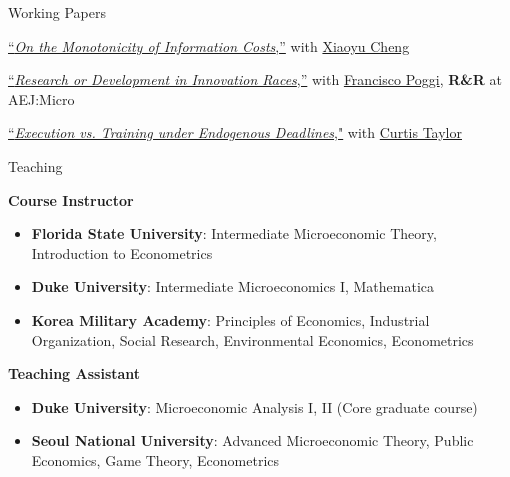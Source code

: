 \begin{rSection}{Working Papers}
	
	\begin{etaremune}
		
		\item \href{https://yonggyun-yg-kim.github.io/files/Research%20papers/BLmonotonicity.pdf}{``\textit{On the Monotonicity of Information Costs},''} with \href{https://xiaoyu-cheng.com/}{Xiaoyu Cheng}
		
		
		\item \href{https://yonggyun-yg-kim.github.io/files/Research%20papers/RDIR.pdf}{``\textit{Research or Development in Innovation Races},''}   with \href{https://www.franciscopoggi.com/}{Francisco Poggi}, \textbf{R\&R} at AEJ:Micro
		
		\item \href{https://yonggyun-yg-kim.github.io/files/Research%20papers/Execution-v-Training.pdf}{``\textit{Execution vs. Training under Endogenous Deadlines},"} with \href{https://sites.google.com/view/curtistaylor/home}{Curtis Taylor}
		
	\end{etaremune}
	
	
\end{rSection}
\medskip

\begin{rSection}{Teaching}
	
	
	\textbf{Course Instructor}	
	\begin{itemize}
		\item[] \textbf{Florida State University}: Intermediate Microeconomic Theory, Introduction to Econometrics
		\item[] \textbf{Duke University}: Intermediate Microeconomics I, Mathematica 
		\item[] \textbf{Korea Military Academy}: Principles of Economics, Industrial Organization, Social Research, Environmental Economics, Econometrics 
	\end{itemize}
	
	\textbf{Teaching Assistant}
	\begin{itemize}
		\item[] \textbf{Duke University}: Microeconomic Analysis I, II (Core graduate course) 
		\item[] \textbf{Seoul National University}: Advanced Microeconomic Theory, Public Economics, Game Theory, Econometrics
	\end{itemize}
	
\end{rSection}
\medskip

